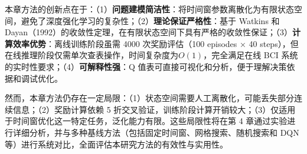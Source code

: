 本章方法的创新点在于：（1）\textbf{问题建模简洁性}：将时间窗参数离散化为有限状态空间，避免了深度强化学习的复杂性；（2）\textbf{理论保证严格性}：基于 Watkins 和 Dayan（1992）的收敛性定理，在有限状态空间下具有严格的收敛性保证；（3）\textbf{计算效率优势}：离线训练阶段虽需 4000 次奖励评估（100 episodes × 40 steps），但在线推理阶段仅需单次查表操作，时间复杂度为$O(1)$，完全满足在线 BCI 系统的实时性要求；（4）\textbf{可解释性强}：Q 值表可直接可视化和分析，便于理解决策依据和调试优化。

然而，本章方法仍存在一定局限：（1）状态空间需要人工离散化，可能丢失部分连续信息；（2）奖励计算依赖 5 折交叉验证，训练阶段计算开销较大；（3）仅适用于时间窗优化这一特定任务，泛化能力有限。这些局限性将在第 4 章通过实验进行详细分析，并与多种基线方法（包括固定时间窗、网格搜索、随机搜索和 DQN 等）进行系统对比，全面评估本研究方法的有效性与实用性。
